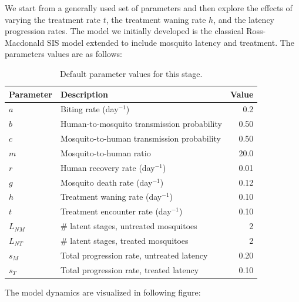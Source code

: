 \documentclass[11pt]{article}
\begin{document}
We start from a generally used set of parameters and then explore the effects of varying the treatment rate $t$, the treatment waning rate $h$, and the latency progression rates. The model we initially developed is the classical Ross-Macdonald SIS model extended to include mosquito latency and treatment. The parameters values are as follows:
\begin{table}[H]
  \centering
  \begin{tabular}{llr}
    \toprule
    Parameter & Description & Value \\
    \midrule
    $a$          & Biting rate (day$^{-1}$)                     & 0.2   \\
    $b$          & Human-to-mosquito transmission probability    & 0.50    \\
    $c$          & Mosquito-to-human transmission probability    & 0.50    \\
    $m$          & Mosquito-to-human ratio                       & 20.0    \\
    $r$          & Human recovery rate (day$^{-1}$)             & 0.01    \\
    $g$          & Mosquito death rate (day$^{-1}$)             & 0.12    \\
    $h$          & Treatment waning rate (day$^{-1}$)           & 0.10    \\
    $t$          & Treatment encounter rate (day$^{-1}$)        & 0.10    \\
    $L_{NM}$     & \# latent stages, untreated mosquitoes        & 2       \\
    $L_{NT}$     & \# latent stages, treated mosquitoes          & 2       \\
    $s_M$        & Total progression rate, untreated latency     & 0.20    \\
    $s_T$        & Total progression rate, treated latency       & 0.10    \\
    \bottomrule
  \end{tabular}
  \caption{Default parameter values for this stage.}
\end{table}

The model dynamics are visualized in following figure:
\end{document}
